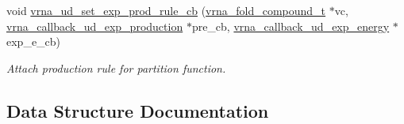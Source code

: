 \begin{DoxyCompactItemize}
void \hyperlink{group__domains__up_ga2fb1db2099da26c76247e1209ad4aa09}{vrna\+\_\+ud\+\_\+set\+\_\+exp\+\_\+prod\+\_\+rule\+\_\+cb} (\hyperlink{group__fold__compound_ga1b0cef17fd40466cef5968eaeeff6166}{vrna\+\_\+fold\+\_\+compound\+\_\+t} $\ast$vc, \hyperlink{group__domains__up_ga33d78327dcd04c1ca5ab2887edc18c7b}{vrna\+\_\+callback\+\_\+ud\+\_\+exp\+\_\+production} $\ast$pre\+\_\+cb, \hyperlink{group__domains__up_ga861706f257ba993753464b823e65b86e}{vrna\+\_\+callback\+\_\+ud\+\_\+exp\+\_\+energy} $\ast$exp\+\_\+e\+\_\+cb)
\begin{DoxyCompactList}\small\item\em Attach production rule for partition function. \end{DoxyCompactList}\end{DoxyCompactItemize}


\subsection{Data Structure Documentation}
\label{structvrna__unstructured__domain__s}
